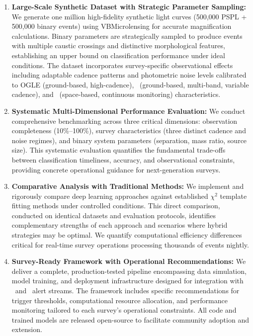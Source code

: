 \begin{enumerate}
    \item \textbf{Large-Scale Synthetic Dataset with Strategic Parameter Sampling:} We generate one million high-fidelity synthetic light curves (500,000 PSPL + 500,000 binary events) using VBMicrolensing for accurate magnification calculations. Binary parameters are strategically sampled to produce events with multiple caustic crossings and distinctive morphological features, establishing an upper bound on classification performance under ideal conditions. The dataset incorporates survey-specific observational effects including adaptable cadence patterns and photometric noise levels calibrated to OGLE (ground-based, high-cadence), \lsst\ (ground-based, multi-band, variable cadence), and \romantel\ (space-based, continuous monitoring) characteristics.
    
    \item \textbf{Systematic Multi-Dimensional Performance Evaluation:} We conduct comprehensive benchmarking across three critical dimensions: observation completeness (10\%--100\%), survey characteristics (three distinct cadence and noise regimes), and binary system parameters (separation, mass ratio, source size). This systematic evaluation quantifies the fundamental trade-offs between classification timeliness, accuracy, and observational constraints, providing concrete operational guidance for next-generation surveys.
    
    \item \textbf{Comparative Analysis with Traditional Methods:} We implement and rigorously compare deep learning approaches against established $\chi^2$ template fitting methods under controlled conditions. This direct comparison, conducted on identical datasets and evaluation protocols, identifies complementary strengths of each approach and scenarios where hybrid strategies may be optimal. We quantify computational efficiency differences critical for real-time survey operations processing thousands of events nightly.
    
    \item \textbf{Survey-Ready Framework with Operational Recommendations:} We deliver a complete, production-tested pipeline encompassing data simulation, model training, and deployment infrastructure designed for integration with \lsst\ and \romantel\ alert streams. The framework includes specific recommendations for trigger thresholds, computational resource allocation, and performance monitoring tailored to each survey's operational constraints. All code and trained models are released open-source to facilitate community adoption and extension.
    

\end{enumerate}
